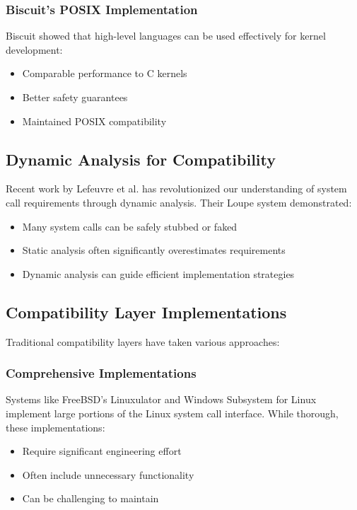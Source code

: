 \documentclass[conference]{IEEEtran}
\begin{document}
\subsubsection{Biscuit's POSIX Implementation}
Biscuit \cite{go_kernel} showed that high-level languages can be used effectively for kernel development:
\begin{itemize}
	\item Comparable performance to C kernels
	\item Better safety guarantees
	\item Maintained POSIX compatibility
\end{itemize}

\subsection{Dynamic Analysis for Compatibility}
Recent work by Lefeuvre et al. \cite{lefeuvre2024loupe} has revolutionized our understanding of system call requirements through dynamic analysis. Their Loupe system demonstrated:
\begin{itemize}
	\item Many system calls can be safely stubbed or faked
	\item Static analysis often significantly overestimates requirements
	\item Dynamic analysis can guide efficient implementation strategies
\end{itemize}

\subsection{Compatibility Layer Implementations}
Traditional compatibility layers have taken various approaches:

\subsubsection{Comprehensive Implementations}
Systems like FreeBSD's Linuxulator and Windows Subsystem for Linux implement large portions of the Linux system call interface. While thorough, these implementations:
\begin{itemize}
	\item Require significant engineering effort
	\item Often include unnecessary functionality
	\item Can be challenging to maintain
\end{itemize}
\end{document}
